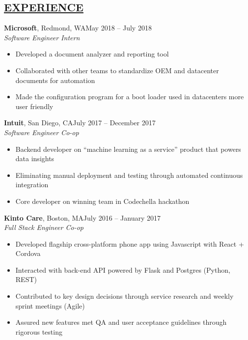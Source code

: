 \documentclass[overlapped,line]{res}
\begin{document}
\begin{resume}
\noindent\makebox[7.15in]{\rule{7.15in}{0.4pt}}

\section{\underline{EXPERIENCE}}

\textbf{Microsoft}, Redmond, WA\hfill May 2018 \--- July 2018\\
{\sl Software Engineer Intern}
\begin{itemize} \itemsep -2pt
\item Developed a document analyzer and reporting tool
\item Collaborated with other teams to standardize OEM and datacenter documents for automation
\item Made the configuration program for a boot loader used in datacenters more user friendly
\end{itemize}

\textbf{Intuit}, San Diego, CA\hfill July 2017 \--- December 2017\\
{\sl Software Engineer Co-op}
\begin{itemize} \itemsep -2pt
\item Backend developer on ``machine learning as a service'' product that powers data insights
\item Eliminating manual deployment and testing through automated continuous integration
\item Core developer on winning team in Codechella hackathon
\end{itemize}

\textbf{Kinto Care}, Boston, MA\hfill July 2016 \--- January 2017\\
{\sl Full Stack Engineer Co-op}
\begin{itemize} \itemsep -2pt
\item Developed flagship cross-platform phone app using Javascript with React + Cordova
\item Interacted with back-end API powered by Flask and Postgres (Python, REST)
\item Contributed to key design decisions through service research and weekly sprint meetings (Agile)
\item Assured new features met QA and user acceptance guidelines through rigorous testing
\end{itemize}



\end{resume}
\end{document}
